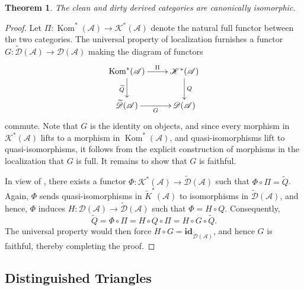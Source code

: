 \documentclass[11pt]{article}
\theoremstyle{thmstyle}
\newtheorem{theorem}{Theorem}[section]
\theoremstyle{defstyle}
\newcommand{\id}{\mathbf{id}}
\newcommand{\scrA}{\mathscr{A}}
\newcommand{\scrD}{\mathscr{D}}
\newcommand{\wt}[1]{\widetilde{#1}}
\newcommand{\Kom}{\operatorname{Kom}}
\newcommand{\scrK}{\mathscr{K}}
\begin{document}
\begin{theorem}
	The clean and dirty derived categories are canonically isomorphic.
\end{theorem}
\begin{proof}
	Let $\Pi\colon\Kom^\ast(\scrA)\to\scrK^\ast(\scrA)$ denote the natural full functor between the two categories. The universal property of localization furnishes a functor $G\colon\wt\scrD(\scrA)\to\scrD(\scrA)$ making the diagram of functors
	\begin{equation*}
		\xymatrix {
			\Kom^\ast(\scrA)\ar[r]^-\Pi\ar[d]_{\wt Q} & \scrK^\ast(\scrA)\ar[d]^{Q}\\
			\wt\scrD(\scrA)\ar[r]_{G} & \scrD(\scrA)
		}
	\end{equation*}
	commute. Note that $G$ is the identity on objects, and since every morphism in $\scrK^\ast(\scrA)$ lifts to a morphism in $\Kom^\ast(\scrA)$, and quasi-isomorphisms lift to quasi-isomorphisms, it follows from the explicit construction of morphisms in the localization that $G$ is full. It remains to show that $G$ is faithful. 

	In view of , there exists a functor $\Phi\colon\scrK^\ast(\scrA)\to\wt\scrD(\scrA)$ such that $\Phi\circ\Pi = \wt Q$. Again, $\Phi$ sends quasi-isomorphisms in $\wt K^\ast(\scrA)$ to isomorphisms in $\wt\scrD(\scrA)$, and hence, $\Phi$ induces $H\colon\scrD(\scrA)\to\wt\scrD(\scrA)$ such that $\Phi = H\circ Q$. Consequently, 
	\begin{equation*}
		\wt Q = \Phi\circ\Pi = H\circ Q\circ\Pi = H\circ G\circ\wt Q.
	\end{equation*}
	The universal property would then force $H\circ G = \id_{\wt\scrD(\scrA)}$, and hence $G$ is faithful, thereby completing the proof.
\end{proof}

\subsection{Distinguished Triangles}
\end{document}
